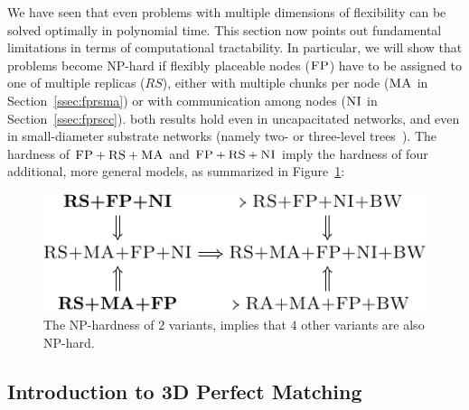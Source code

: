 \documentclass[preprint,12pt]{elsarticle}
\newcommand{\maciek}[1]{\textcolor{brown}{maciek: #1}}
\newcommand{\CC}{\textsc{NI}}
\newcommand{\FP}{\textsc{FP}}
\newcommand{\RS}{\textsc{RS}}
\newcommand{\MA}{\textsc{MA}}
\begin{document}
We have seen that even problems with multiple dimensions of
flexibility can be solved optimally in polynomial time.
This section now points out fundamental
limitations in terms of computational tractability.
In particular, we
will show that problems become NP-hard if flexibly placeable nodes ($\FP$) have to be assigned to one of multiple replicas ($RS$), either with multiple chunks per node ($\MA$ in Section~\ref{ssec:fprsma}) or with communication among nodes ($\CC$ in Section~\ref{ssec:fprscc}).
both results hold even in uncapacitated networks, and even in small-diameter
substrate networks (namely two- or three-level trees~\cite{fattree}).
The hardness of $\FP+\RS+\MA$ and $\FP+\RS+\CC$ imply
the hardness of four additional, more general models, as
summarized in Figure~\ref{fig:np_implications}:\\
\begin{figure}[htbp]
\includegraphics[width = \columnwidth]{figs/np_implications}
\caption{The NP-hardness of $2$ variants, implies that $4$ other variants are
also NP-hard.}
\label{fig:np_implications}
\end{figure}


\subsection{Introduction to 3D Perfect Matching}
\label{sec:3dm_intro}
\end{document}
